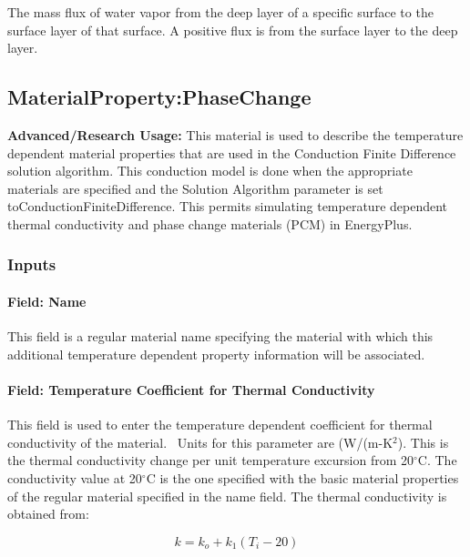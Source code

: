 The mass flux of water vapor from the deep layer of a specific surface to the surface layer of that surface. A positive flux is from the surface layer to the deep layer.

\subsection{MaterialProperty:PhaseChange}\label{materialpropertyphasechange}

\textbf{Advanced/Research Usage:} This material is used to describe the temperature dependent material properties that are used in the Conduction Finite Difference solution algorithm. This conduction model is done when the appropriate materials are specified and the Solution Algorithm parameter is set toConductionFiniteDifference. This permits simulating temperature dependent thermal conductivity and phase change materials (PCM) in EnergyPlus.

\subsubsection{Inputs}\label{inputs-5-030}

\paragraph{Field: Name}\label{field-name-5-024}

This field is a regular material name specifying the material with which this additional temperature dependent property information will be associated.

\paragraph{Field: Temperature Coefficient for Thermal Conductivity}\label{field-temperature-coefficient-for-thermal-conductivity}

This field is used to enter the temperature dependent coefficient for thermal conductivity of the material.~ Units for this parameter are (W/(m-K\(^{2}\)). This is the thermal conductivity change per unit temperature excursion from 20$^\circ$C. The conductivity value at 20$^\circ$C is the one specified with the basic material properties of the regular material specified in the name field. The thermal conductivity is obtained from:

\begin{equation}
k = {k_o} + {k_1}({T_i} - 20)
\end{equation}


